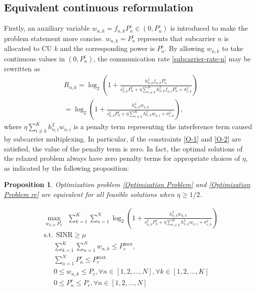 \documentclass[a4paper,journal,10pt]{IEEEtran}
\newtheorem{proposition}{Proposition}
\begin{document}
\subsection{Equivalent continuous reformulation}
Firstly, an auxiliary variable $w_{n,k}=f_{n,k}P^c_{n} \in \left(0, P^c_{n}\right)$ is introduced to make the problem statement more concise. $w_{n,k} = P^c_{n}$ represents that subcarrier $n$ is allocated to CU $k$ and the corresponding power is $P^c_n$. By allowing $w_{n,k}$ to take continuous values in $\left(0, P^c_{n}\right)$, the communication rate \eqref{subcarrier-rate-n} may be rewritten as
\setcounter{equation}{6}
\begin{align}\label{subcarrier-rate-n-1}
		&R_{n,k}=\log_2\left(1+\frac{h_{n,k}^2 f_{n,k} P_n^c}{s_{n,k}^2P_{n}^r+\eta\sum_{i\neq k}^{K}h_{n,k}^2 f_{n,i} P_n^c+\sigma_{c,k}^2}\right)\nonumber \\
		&=\log_2\left(1+\frac{h_{n,k}^2 w_{n,k}}{s_{n,k}^2P_n^r+\eta\sum_{i\neq k}^{K}h_{n,k}^2 w_{n,i}+\sigma_{c,k}^2}\right),
\end{align}
where $\eta\sum_{i\neq k}^{K}h_{n,i}^2 w_{n,i}$ is a penalty term representing the interference term caused by subcarrier multiplexing. In particular, if the constraints \eqref{O-1} and \eqref{O-2} are satisfied, the value of the penalty term is zero. In fact, the optimal solutions of the relaxed problem always have zero penalty terms for appropriate choices of $\eta$, as indicated by the following proposition: 
\begin{proposition}\label{Proposition:equicvalence}
	Optimization problem \eqref{Optimization Problem} and \eqref{Optimization Problem re} are equivalent for all feasible solutions when $\eta \ge 1/2$.
 {\begin{small}
	\begin{subequations}\label{Optimization Problem re}
		\begin{align}
			&\max\limits_{w_{n,k}, P_n^r} \ \  \sum_{k=1}^{K}\sum_{n=1}^{N}\log_2\left(1+\frac{h_{n,k}^2 w_{n,k}}{s_{n,k}^2P_n^r+\eta\sum_{i\neq k}^{K}h_{n,k}^2 w_{n,i}+\sigma_{c,k}^2}\right) \label{O-main-re} \\
			&\mathrm{s.t.}\ \ \mathrm{SINR} \ge \mu \label{O-re-1}\\
			&\quad \ \ \sum_{k=1}^{K}\sum_{n=1}^{N} w_{n,k}\leq P_{c}^{\max}, \label{O-re-2}\\
			&\quad \ \ \sum_{n=1}^{N} P_n^r\leq P_{r}^{\max} \label{O-re-3}\\
			&\quad \ \ 0\leq w_{n,k}\leq P_c, \forall n\in  [1,2,\dots,N], \forall k\in  [1,2,\dots,K] \label{O-re-4}\\
			&\quad \ \ 0\leq P_n^r\leq P_r, \forall n\in  [1,2,\dots,N] \label{O-re-5}
		\end{align}
	\end{subequations}
  \end{small}}
\end{proposition}
\end{document}
